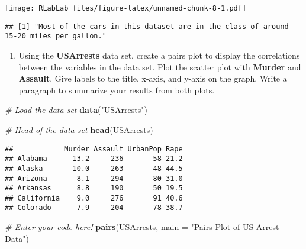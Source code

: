 \documentclass[
]{article}
\newenvironment{Shaded}{\begin{snugshade}}{\end{snugshade}}
\newcommand{\AttributeTok}[1]{\textcolor[rgb]{0.13,0.29,0.53}{#1}}
\newcommand{\CommentTok}[1]{\textcolor[rgb]{0.56,0.35,0.01}{\textit{#1}}}
\newcommand{\DecValTok}[1]{\textcolor[rgb]{0.00,0.00,0.81}{#1}}
\newcommand{\FunctionTok}[1]{\textcolor[rgb]{0.13,0.29,0.53}{\textbf{#1}}}
\newcommand{\NormalTok}[1]{#1}
\newcommand{\OtherTok}[1]{\textcolor[rgb]{0.56,0.35,0.01}{#1}}
\newcommand{\SpecialCharTok}[1]{\textcolor[rgb]{0.81,0.36,0.00}{\textbf{#1}}}
\newcommand{\StringTok}[1]{\textcolor[rgb]{0.31,0.60,0.02}{#1}}
\providecommand{\tightlist}{%
  \setlength{\itemsep}{0pt}\setlength{\parskip}{0pt}}
\begin{document}
\texttt{[image: RLabLab\_files/figure-latex/unnamed-chunk-8-1.pdf]}

\begin{Shaded}
\end{Shaded}

\begin{verbatim}
## [1] "Most of the cars in this dataset are in the class of around 15-20 miles per gallon."
\end{verbatim}

\begin{enumerate}
\def\labelenumi{\alph{enumi}.}
\setcounter{enumi}{2}
\tightlist
\item
  Using the \textbf{USArrests} data set, create a pairs plot to display
  the correlations between the variables in the data set. Plot the
  scatter plot with \textbf{Murder} and \textbf{Assault}. Give labels to
  the title, x-axis, and y-axis on the graph. Write a paragraph to
  summarize your results from both plots.
\end{enumerate}

\begin{Shaded}
\begin{Highlighting}[]
\CommentTok{\# Load the data set}
\FunctionTok{data}\NormalTok{(}\StringTok{"USArrests"}\NormalTok{)}

\CommentTok{\# Head of the data set}
\FunctionTok{head}\NormalTok{(USArrests)}
\end{Highlighting}
\end{Shaded}

\begin{verbatim}
##            Murder Assault UrbanPop Rape
## Alabama      13.2     236       58 21.2
## Alaska       10.0     263       48 44.5
## Arizona       8.1     294       80 31.0
## Arkansas      8.8     190       50 19.5
## California    9.0     276       91 40.6
## Colorado      7.9     204       78 38.7
\end{verbatim}

\begin{Shaded}
\begin{Highlighting}[]
\CommentTok{\# Enter your code here!}
\FunctionTok{pairs}\NormalTok{(USArrests, }\AttributeTok{main =} \StringTok{"Pairs Plot of US Arrest Data"}\NormalTok{)}
\end{Highlighting}
\end{Shaded}
\end{document}

